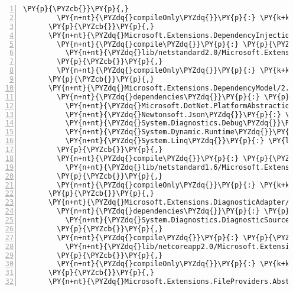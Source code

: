 \begin{Verbatim}[commandchars=\\\{\},numbers=left,firstnumber=1,stepnumber=1,numberblanklines=0]
        \PY{p}{\PYZcb{}}\PY{p}{,}
        \PY{n+nt}{\PYZdq{}compileOnly\PYZdq{}}\PY{p}{:} \PY{k+kc}{true}
      \PY{p}{\PYZcb{}}\PY{p}{,}
      \PY{n+nt}{\PYZdq{}Microsoft.Extensions.DependencyInjection.Abstractions/2.1.0\PYZhy{}rc1\PYZhy{}final\PYZdq{}}\PY{p}{:} \PY{p}{\PYZob{}}
        \PY{n+nt}{\PYZdq{}compile\PYZdq{}}\PY{p}{:} \PY{p}{\PYZob{}}
          \PY{n+nt}{\PYZdq{}lib/netstandard2.0/Microsoft.Extensions.DependencyInjection.Abstractions.dll\PYZdq{}}\PY{p}{:} \PY{p}{\PYZob{}}\PY{p}{\PYZcb{}}
        \PY{p}{\PYZcb{}}\PY{p}{,}
        \PY{n+nt}{\PYZdq{}compileOnly\PYZdq{}}\PY{p}{:} \PY{k+kc}{true}
      \PY{p}{\PYZcb{}}\PY{p}{,}
      \PY{n+nt}{\PYZdq{}Microsoft.Extensions.DependencyModel/2.1.0\PYZhy{}rc1\PYZdq{}}\PY{p}{:} \PY{p}{\PYZob{}}
        \PY{n+nt}{\PYZdq{}dependencies\PYZdq{}}\PY{p}{:} \PY{p}{\PYZob{}}
          \PY{n+nt}{\PYZdq{}Microsoft.DotNet.PlatformAbstractions\PYZdq{}}\PY{p}{:} \PY{l+s+s2}{\PYZdq{}2.1.0\PYZhy{}rc1\PYZdq{}}\PY{p}{,}
          \PY{n+nt}{\PYZdq{}Newtonsoft.Json\PYZdq{}}\PY{p}{:} \PY{l+s+s2}{\PYZdq{}11.0.2\PYZdq{}}\PY{p}{,}
          \PY{n+nt}{\PYZdq{}System.Diagnostics.Debug\PYZdq{}}\PY{p}{:} \PY{l+s+s2}{\PYZdq{}4.3.0\PYZdq{}}\PY{p}{,}
          \PY{n+nt}{\PYZdq{}System.Dynamic.Runtime\PYZdq{}}\PY{p}{:} \PY{l+s+s2}{\PYZdq{}4.3.0\PYZdq{}}\PY{p}{,}
          \PY{n+nt}{\PYZdq{}System.Linq\PYZdq{}}\PY{p}{:} \PY{l+s+s2}{\PYZdq{}4.3.0\PYZdq{}}
        \PY{p}{\PYZcb{}}\PY{p}{,}
        \PY{n+nt}{\PYZdq{}compile\PYZdq{}}\PY{p}{:} \PY{p}{\PYZob{}}
          \PY{n+nt}{\PYZdq{}lib/netstandard1.6/Microsoft.Extensions.DependencyModel.dll\PYZdq{}}\PY{p}{:} \PY{p}{\PYZob{}}\PY{p}{\PYZcb{}}
        \PY{p}{\PYZcb{}}\PY{p}{,}
        \PY{n+nt}{\PYZdq{}compileOnly\PYZdq{}}\PY{p}{:} \PY{k+kc}{true}
      \PY{p}{\PYZcb{}}\PY{p}{,}
      \PY{n+nt}{\PYZdq{}Microsoft.Extensions.DiagnosticAdapter/2.1.0\PYZhy{}rc1\PYZhy{}final\PYZdq{}}\PY{p}{:} \PY{p}{\PYZob{}}
        \PY{n+nt}{\PYZdq{}dependencies\PYZdq{}}\PY{p}{:} \PY{p}{\PYZob{}}
          \PY{n+nt}{\PYZdq{}System.Diagnostics.DiagnosticSource\PYZdq{}}\PY{p}{:} \PY{l+s+s2}{\PYZdq{}4.5.0\PYZhy{}rc1\PYZdq{}}
        \PY{p}{\PYZcb{}}\PY{p}{,}
        \PY{n+nt}{\PYZdq{}compile\PYZdq{}}\PY{p}{:} \PY{p}{\PYZob{}}
          \PY{n+nt}{\PYZdq{}lib/netcoreapp2.0/Microsoft.Extensions.DiagnosticAdapter.dll\PYZdq{}}\PY{p}{:} \PY{p}{\PYZob{}}\PY{p}{\PYZcb{}}
        \PY{p}{\PYZcb{}}\PY{p}{,}
        \PY{n+nt}{\PYZdq{}compileOnly\PYZdq{}}\PY{p}{:} \PY{k+kc}{true}
      \PY{p}{\PYZcb{}}\PY{p}{,}
      \PY{n+nt}{\PYZdq{}Microsoft.Extensions.FileProviders.Abstractions/2.1.0\PYZhy{}rc1\PYZhy{}final\PYZdq{}}\PY{p}{:} \PY{p}{\PYZob{}}

\end{Verbatim}
